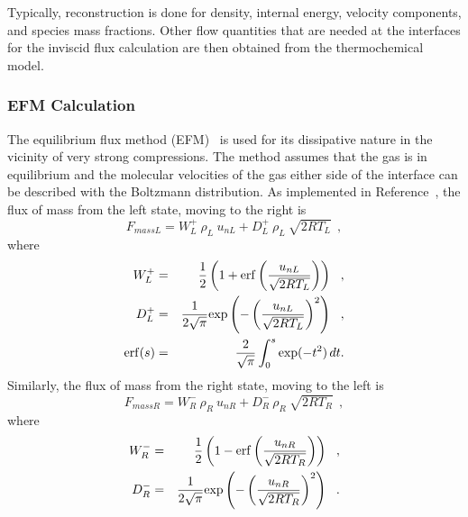 \medskip
Typically, reconstruction is done for density, internal energy, velocity components, and species mass fractions.
Other flow quantities that are needed at the interfaces for the inviscid flux calculation 
are then obtained from the thermochemical model.

\subsubsection{EFM Calculation}
\newcommand{\dtwspi}{\frac{1}{2 \sqrt{\pi}}}
\newcommand{\rtL}{R T_L}
\newcommand{\rtR}{R T_R}
\newcommand{\conpjp}{\frac{1}{2} \frac{\gamma + 1}{\gamma - 1}}
\newcommand{\cmpL}{\sqrt{2 R T_L}}
\newcommand{\cmpR}{\sqrt{2 R T_R}}
\newcommand{\snL}{\frac{u_{nL}}{\cmpL}}
\newcommand{\snR}{\frac{u_{nR}}{\cmpR}}
\newcommand{\hvsqL}{\frac{1}{2}\left(u_{nL}^2 + u_{pL}^2\right)}
\newcommand{\hvsqR}{\frac{1}{2}\left(u_{nR}^2 + u_{pR}^2\right)}
\newcommand{\hL}{e_L + \frac{p_L}{\rho_L}}
\newcommand{\hR}{e_R + \frac{p_R}{\rho_R}}
%
The equilibrium flux method (EFM)~\cite{macrossan_89} is used for its dissipative nature in the
vicinity of very strong compressions. 
The method assumes that the gas is in equilibrium and the molecular velocities of the gas
either side of the interface can be described with the Boltzmann distribution. 
As implemented in Reference~\cite{petrie_repar_1997a}, 
the flux of mass from the left state, moving to the right is
\begin{equation}
 F_{massL} = W_L^+ ~ \rho_L ~ u_{nL} + D_L^+ ~ \rho_L ~ \cmpL ~~,
\end{equation}
where
\begin{eqnarray}
 W_L^+ & = & \frac{1}{2} \left( 1 + {\rm erf}\left(\frac{u_{nL}}{\cmpL} \right) \right) ~~, \nonumber \\
 D_L^+ & = & \dtwspi {\rm exp}\left( -\left( \frac{u_{nL}}{\cmpL} \right)^2 \right) ~~, \nonumber \\
 {\rm erf}(s) & = & \frac{2}{\sqrt{\pi}} \int_0^s \exp(-t^2) \,dt.
\end{eqnarray}
Similarly, the flux of mass from the right state, moving to the left is
\begin{equation}
 F_{massR} = W_R^- ~ \rho_R ~ u_{nR} + D_R^- ~ \rho_R ~ \cmpR ~~,
\end{equation}
where
\begin{eqnarray}
 W_R^- & = & \frac{1}{2} \left( 1 - {\rm erf}\left(\frac{u_{nR}}{\cmpR} \right) \right) ~~, \nonumber \\
 D_R^- & = & \dtwspi {\rm exp}\left( -\left( \frac{u_{nR}}{\cmpR} \right)^2 \right) ~~.
\end{eqnarray}
